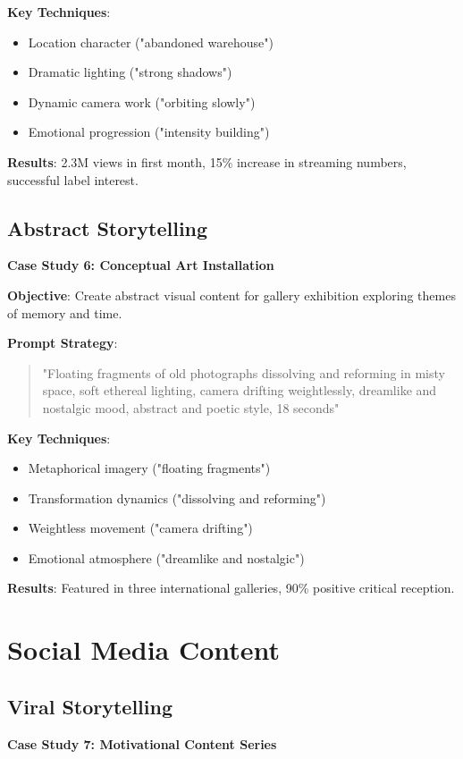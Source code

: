 \textbf{Key Techniques}:
\begin{itemize}
\item Location character ("abandoned warehouse")
\item Dramatic lighting ("strong shadows")
\item Dynamic camera work ("orbiting slowly")
\item Emotional progression ("intensity building")
\end{itemize}

\textbf{Results}: 2.3M views in first month, 15\% increase in streaming numbers, successful label interest.

\subsection{Abstract Storytelling}
\textbf{Case Study 6: Conceptual Art Installation}

\textbf{Objective}: Create abstract visual content for gallery exhibition exploring themes of memory and time.

\textbf{Prompt Strategy}:
\begin{quote}
"Floating fragments of old photographs dissolving and reforming in misty space, soft ethereal lighting, camera drifting weightlessly, dreamlike and nostalgic mood, abstract and poetic style, 18 seconds"
\end{quote}

\textbf{Key Techniques}:
\begin{itemize}
\item Metaphorical imagery ("floating fragments")
\item Transformation dynamics ("dissolving and reforming")
\item Weightless movement ("camera drifting")
\item Emotional atmosphere ("dreamlike and nostalgic")
\end{itemize}

\textbf{Results}: Featured in three international galleries, 90\% positive critical reception.

\section{Social Media Content}

\subsection{Viral Storytelling}
\textbf{Case Study 7: Motivational Content Series}


